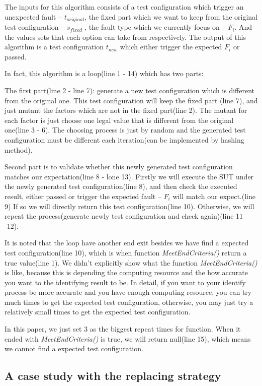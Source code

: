 \documentclass{sig-alternate}
\begin{document}
The inputs for this algorithm consists of a test configuration which trigger an unexpected fault -- $t_{original}$, the fixed part which we want to keep from the original test configuration -- $s_{fixed}$ , the fault type which we currently focus on -- $F_{i}$. And the values sets that each option can take from respectively.  The output of this algorithm is a test configuration $t_{new}$ which either trigger the expected $F_{i}$ or passed.

In fact, this algorithm is a loop(line 1 - 14) which has two parts:

The first part(line 2 - line 7): generate a new test configuration which is different from the original one. This test configuration will keep the fixed part (line 7), and just mutant the factors which are not in the fixed part(line 2). The mutant for each factor is just choose one legal value that is different from the original one(line 3 - 6). The choosing process is just by random and the generated test configuration must be different each iteration(can be implemented by hashing method).

Second part is to validate whether this newly generated test configuration matches our expectation(line 8 - lone 13). Firstly we will execute the SUT under the newly generated test configuration(line 8), and then check the executed result, either passed or trigger the expected fault -- $F_{i}$ will match our expect.(line 9) If so we will directly return this test configuration(line 10). Otherwise, we will repeat the process(generate newly test configuration and check again)(line 11 -12).

It is noted that the loop have another end exit besides we have find a expected test configuration(line 10), which is when function \emph{MeetEndCriteria()} return a true value(line 1). We didn't explicitly show what the function \emph{MeetEndCriteria()} is like, because this is depending the computing resource and the how accurate you want to the identifying result to be. In detail, if you want to your identify process be more accurate and you have enough computing resource, you can try much times to get the expected test configuration, otherwise, you may just try a relatively small times to get the expected test configuration.

In this paper, we just set 3 as the biggest repeat times for function. When it ended with \emph{MeetEndCriteria()} is true, we will return null(line 15), which means we cannot find a expected test configuration.

\subsection{A case study with the replacing strategy}
\end{document}
